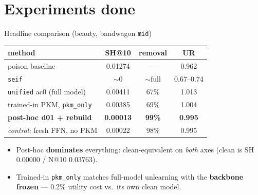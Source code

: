 \documentclass{beamer}
\begin{document}
\section{Experiments done}

\begin{frame}{Headline comparison (beauty, bandwagon \texttt{mid})}
\begin{center}
\begin{tabular}{|l|c|c|c|}
\hline
method & SH@10 & removal & UR \\
\hline
poison baseline                & 0.01274 & ---    & 0.962 \\
\texttt{seif}                  & $\sim$0 & $\sim$full & 0.67--0.74 \\
\texttt{unified} ac0 (full model) & 0.00411 & 67\% & 1.013 \\
\hline
trained-in PKM, \texttt{pkm\_only} & 0.00385 & 69\% & 1.004 \\
\textbf{post-hoc d01 + rebuild}    & \textbf{0.00013} & \textbf{99\%} & \textbf{0.995} \\
\quad \emph{control:} fresh FFN, no PKM & 0.00022 & 98\% & 0.995 \\
\hline
\end{tabular}
\end{center}

\medskip
\begin{itemize}
  \item Post-hoc \textbf{dominates} everything: clean-equivalent on \emph{both}
        axes (clean is SH 0.00000 / N@10 0.03763).
  \item Trained-in \texttt{pkm\_only} matches full-model unlearning with the
        \textbf{backbone frozen} --- 0.2\% utility cost vs.\ its own clean model.
\end{itemize}
\end{frame}
\end{document}
